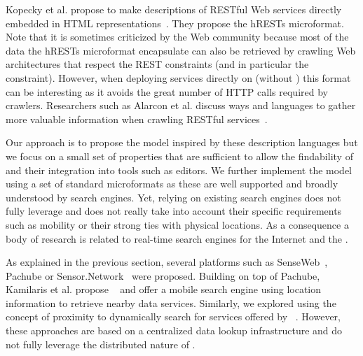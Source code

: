 Kopecky et al. propose to make descriptions of RESTful Web services directly embedded in HTML representations~\cite{Kopecky2008}. They propose the hRESTs microformat. Note that it is sometimes criticized by the Web community because most of the data the hRESTs microformat encapsulate can also be retrieved by crawling Web architectures that respect the REST constraints (and in particular the  constraint). However, when deploying services directly on \sts{} (without \sgs{}) this format can be interesting as it avoids the great number of HTTP calls required by crawlers. Researchers such as Alarcon et al. discuss ways and languages to gather more valuable information when crawling RESTful services~\cite{Alarcon2010}.

Our approach is to propose the \stm{} model inspired by these description languages but we focus on a small set of properties that are sufficient to allow the findability of \sts{} and their integration into tools such as \pMashups{} editors. We further implement the model using a set of standard microformats as these are well supported and broadly understood by search engines. Yet, relying on existing search engines does not fully leverage \sts{} and does not really take into account their specific requirements such as mobility or their strong ties with physical locations. As a consequence a body of research is related to real-time search engines for the Internet and the \WoTLong{}.

As explained in the previous section, several platforms such as SenseWeb~\cite{Grosky2007,Luo2008}, Pachube or Sensor.Network~\cite{Gupta2010} were proposed. Building on top of Pachube, Kamilaris et al. propose ~\cite{Kamilaris2010} and offer a mobile search engine using location information to retrieve nearby data services. Similarly, we explored using the concept of proximity to dynamically search for services offered by \sts{}~\cite{Gellersen2009}. However, these approaches are based on a centralized data lookup infrastructure and do not fully leverage the distributed nature of \sts{}.

